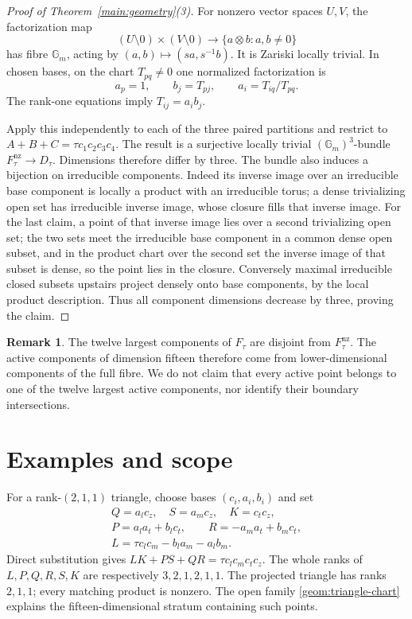 \documentclass[11pt,letterpaper]{article}
\newcommand{\Gm}{\mathbb G_m}
\newcommand{\Ftau}{F_\tau}
\newcommand{\Fact}{F_\tau^{\mathrm{nz}}}
\newcommand{\Ddec}{D_\tau}
\theoremstyle{definition}
\newtheorem{remark}[theorem]{Remark}
\begin{document}
\begin{proof}[Proof of Theorem~\ref{main:geometry}(3)]
For nonzero vector spaces \(U,V\), the factorization map
\[
 (U\setminus0)\times(V\setminus0)\longrightarrow
 \{a\otimes b:a,b\ne0\}
\]
has fibre \(\Gm\), acting by \((a,b)\mapsto(sa,s^{-1}b)\).
It is Zariski locally trivial. In chosen bases, on the chart \(T_{pq}\ne0\)
one normalized factorization is
\[
 a_p=1,\qquad b_j=T_{pj},\qquad a_i=T_{iq}/T_{pq}.
\]
The rank-one equations imply \(T_{ij}=a_i b_j\).

Apply this independently to each of the three paired partitions and
restrict to \(A+B+C=\tau c_1c_2c_3c_4\).
The result is a surjective locally trivial \((\Gm)^3\)-bundle
\(\Fact\to\Ddec\). Dimensions therefore differ by three.
The bundle also induces a bijection on irreducible components.
Indeed its inverse image over an irreducible base component is locally
a product with an irreducible torus; a dense trivializing open set has
irreducible inverse image, whose closure fills that inverse image.
For the last claim, a point of that inverse image lies over a second
trivializing open set; the two sets meet the irreducible base component
in a common dense open subset, and in the product chart over the second
set the inverse image of that subset is dense, so the point lies in the
closure.
Conversely maximal irreducible closed subsets upstairs project densely
onto base components, by the local product description.
Thus all component dimensions decrease by three, proving the claim.
\end{proof}

\begin{remark}
The twelve largest components of \(\Ftau\) are disjoint from \(\Fact\).
The active components of dimension fifteen therefore come from
lower-dimensional components of the full fibre. We do not claim that
every active point belongs to one of the twelve largest active components,
nor identify their boundary intersections.
\end{remark}

\section{Examples and scope}\label{examples:section}

For a rank-\((2,1,1)\) triangle, choose bases \((c_i,a_i,b_i)\) and set
\[
 \begin{gathered}
 Q=a_lc_z,\quad S=a_mc_z,\quad K=c_tc_z,\\
 P=a_la_t+b_lc_t,\qquad
 R=-a_ma_t+b_mc_t,\\
 L=\tau c_lc_m-b_la_m-a_lb_m.
 \end{gathered}
\]
Direct substitution gives \(LK+PS+QR=\tau c_lc_mc_tc_z\).
The whole ranks of \(L,P,Q,R,S,K\) are respectively \(3,2,1,2,1,1\).
The projected triangle has ranks \(2,1,1\); every matching product is
nonzero. The open family \eqref{geom:triangle-chart} explains the
fifteen-dimensional stratum containing such points.
\end{document}
